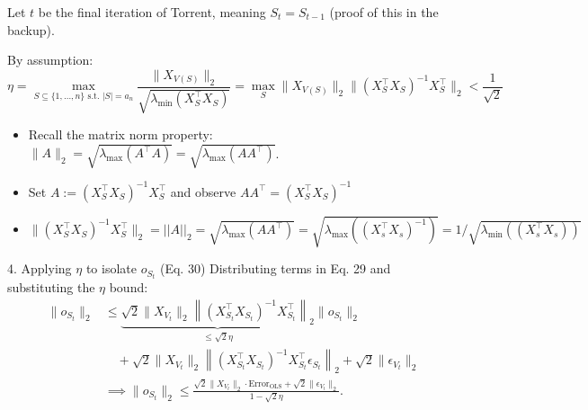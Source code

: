 \begin{frame}[shrink=7.5]
    Let $t$ be the final iteration of Torrent, meaning $S_t = S_{t-1}$ {\tiny (proof of this in the backup)}. 
    
    By assumption:
    \vspace{-0.4cm}
    \begin{equation*}
        \eta = \max_{S \subseteq \{1,\dots,n\} \text{ s.t. } |S|=a_n} \frac{\|X_{V(S)}\|_2}{\sqrt{\lambda_{\min}(X_S^\top X_S)}} = \max_S \|X_{V(S)}\|_2 \|(X_S^\top X_S)^{-1} X_S^\top\|_2 < \frac{1}{\sqrt{2}}
    \end{equation*}
    \vspace{-0.4cm}
    {\small
    \begin{itemize}
        \item Recall the matrix norm property: $\|A\|_2 = \sqrt{\lambda_{\max}(A^\top A)} = \sqrt{\lambda_{\max}(AA^\top)}$. 
        \item Set $A := (X_S^\top X_S)^{-1} X_S^\top$ and observe $AA^\top = (X_S^\top X_S )^{-1}$ 
        \item {\scriptsize $\|(X_S^\top X_S)^{-1} X_S^\top\|_2 = ||A||_2 = \sqrt{\lambda_{\max}(AA^\top)} = \sqrt{\lambda_{\max}((X_s^\top X_s)^{-1})} = 1/\sqrt{\lambda_{\min}((X_s^\top X_s))}$}
    \end{itemize}
    }

    \begin{block}{4. Applying $\eta$ to isolate $o_{S_t}$ (Eq. 30)}
        Distributing terms in Eq. 29 and substituting the $\eta$ bound:
        \vspace{-0.4cm}
        \begin{align*}
        \|o_{S_t}\|_2 &\leq \underbrace{\sqrt{2}\|X_{V_t}\|_2 \left\|\left(X_{S_{t}}^\top X_{S_{t}}\right)^{-1} X_{S_{t}}^\top \right\|_2}_{\leq \sqrt{2}\eta} \|o_{S_{t}}\|_2 \\
        &\quad + \sqrt{2}\|X_{V_t}\|_2 \left\|\left(X_{S_{t}}^\top X_{S_{t}}\right)^{-1} X_{S_{t}}^\top \epsilon_{S_{t}} \right\|_2 + \sqrt{2}\|\epsilon_{V_t}\|_2 \\[1ex]
        &\implies \|o_{S_t}\|_2 \leq \frac{\sqrt{2}\|X_{V_t}\|_2 \cdot \text{Error}_\text{OLS} + \sqrt{2}\|\epsilon_{V_t}\|_2}{1 - \sqrt{2}\eta}.
        \end{align*}
    \end{block}
\end{frame}

